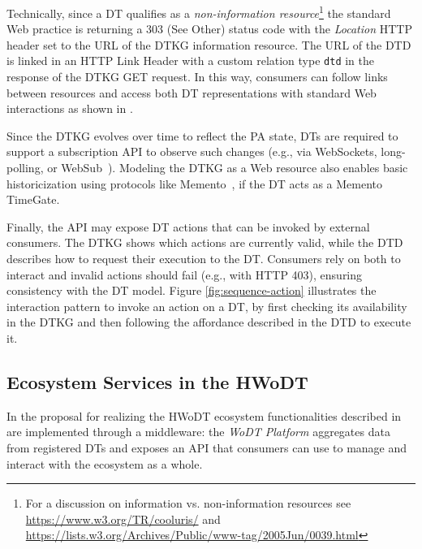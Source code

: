 Technically, since a \ac{DT} qualifies as a \emph{non-information resource}\footnote{For a discussion on information vs. non-information resources see \url{https://www.w3.org/TR/cooluris/} and \url{https://lists.w3.org/Archives/Public/www-tag/2005Jun/0039.html}}
the standard Web practice is returning a 303 (See Other) status code with the \textit{Location} HTTP header set to the \ac{URL} of the \ac{DTKG} information resource.
%
The \ac{URL} of the \ac{DTD} is linked in an HTTP Link Header with a custom relation type \texttt{dtd} in the response of the \ac{DTKG} GET request.
%
In this way, consumers can follow links between resources and access both \ac{DT} representations with standard Web interactions as shown in .

Since the \ac{DTKG} evolves over time to reflect the \ac{PA} state, \acp{DT} are required to support a subscription \ac{API} to observe such changes (e.g., via WebSockets, long-polling, or WebSub~\cite{websub}).
Modeling the \ac{DTKG} as a Web resource also enables basic historicization using protocols like Memento~\cite{rfc7089}, if the \ac{DT} acts as a Memento TimeGate.

Finally, the \ac{API} may expose \ac{DT} actions that can be invoked by external consumers.
The \ac{DTKG} shows which actions are currently valid, while the \ac{DTD} describes how to request their execution to the \ac{DT}.
Consumers rely on both to interact and invalid actions should fail (e.g., with HTTP 403), ensuring consistency with the \ac{DT} model.
%
Figure \ref{fig:sequence-action} illustrates the interaction pattern to invoke an action on a \ac{DT}, by first checking its availability in the \ac{DTKG} and then following the affordance described in the \ac{DTD} to execute it.

\subsection{Ecosystem Services in the HWoDT}
\label{ssec:ecosystem-services}

In the proposal for realizing the \ac{HWoDT} ecosystem functionalities described in  are implemented through a middleware:
%
the \emph{\ac{WoDT} Platform} aggregates data from registered \acp{DT} and exposes an \ac{API} that consumers can use to manage and interact with the ecosystem as a whole.

